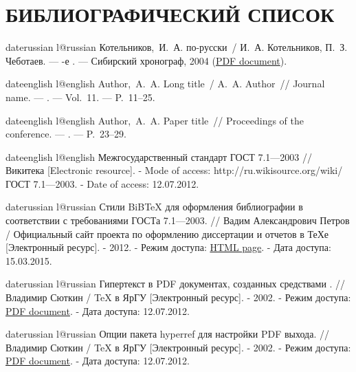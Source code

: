 \chapter*{БИБЛИОГРАФИЧЕСКИЙ СПИСОК}


\begin{thebibliography}{6}
\def\selectlanguageifdefined#1{
\expandafter\ifx\csname date#1\endcsname\relax
\else\language\csname l@#1\endcsname\fi}

\selectlanguageifdefined{russian}
Котельников,~И.~А. \LaTeXe{} по-русски~/ И.~А. Котельников, П.~З.
  Чеботаев. ---
-е {\cyr\cyri\cyrz\cyrd.} ---
\newblock Сибирский хронограф, 2004 (\href{http://www.tex.uniyar.ac.ru/doc/kotelnikovchebotaev2004b.pdf}{PDF document}).

\selectlanguageifdefined{english}
Author,~A.~A. Long title~/ A.~A. Author~// Journal name. ---
. ---
\newblock Vol.~11. ---
\newblock P.~11--25.

\selectlanguageifdefined{english}
Author,~A.~A. Paper title~// Proceedings of the conference. ---
. ---
\newblock P.~23--29.

\selectlanguageifdefined{english}
Межгосударственный стандарт ГОСТ 7.1—2003 // Викитека [Electronic resource]. - Mode of access: http://ru.wikisource.org/wiki/ГОСТ 7.1—2003.  - Date of access: 12.07.2012.

\selectlanguageifdefined{russian}
Стили BiB\TeX{} для оформления библиографии в соответствии с требованиями ГОСТа 7.1—2003. // Вадим Александрович Петров / Официальный сайт проекта по оформлению диссертации и отчетов в ТеХе  [Электронный ресурс]. - 2012.
 - Режим доступа: \href{https://github.com/belgraviton/thesisby/releases/tag/v1.0}{HTML page}. - Дата доступа: 15.03.2015.

\selectlanguageifdefined{russian}
Гипертекст в PDF документах, созданных средствами \LaTeXe. // Владимир Сюткин / \TeX{} в ЯрГУ  [Электронный ресурс]. - 2002.
 - Режим доступа: \href{http://www.tex.uniyar.ac.ru/doc/href\_in\_LaTeX.pdf}{PDF document}. - Дата доступа: 12.07.2012.

\selectlanguageifdefined{russian}
Опции пакета hyperref для настройки PDF выхода. // Владимир Сюткин / \TeX{} в ЯрГУ  [Электронный ресурс]. - 2002. - Режим доступа:
\href{http://www.tex.uniyar.ac.ru/doc/hyperref\_options.pdf}{PDF document}.  - Дата доступа: 12.07.2012.


\end{thebibliography}
